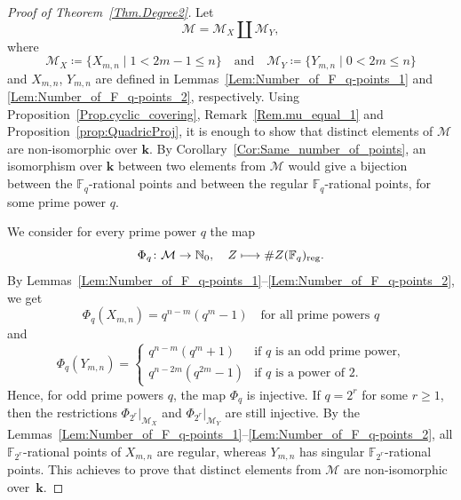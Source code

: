 \documentclass[JEP,XML,SOM,Unicode,NoFloatCountersInSection,published]{cedram}
\newcommand\mto{\mathchoice{\longmapsto}{\mapsto}{\mapsto}{\mapsto}}
\newcommand\quand{\quad\text{and}\quad}
\theoremstyle{definition}
\renewcommand\k{{\mathbf k}}
\newcommand\FF{{\mathbb F}}
\newcommand\NN{{\mathbb N}}
\newcommand{\kk}{\mathbf{k}}
\DeclareMathOperator{\reg}{reg}
\newcommand{\set}[2]{\{#1 \mid #2\}}
\begin{document}
\begin{proof}[Proof of Theorem~\ref{Thm.Degree2}]
Let
\[
\mathcal{M} = \mathcal{M}_X \coprod \mathcal{M}_Y,
\]
where
\[
\mathcal{M}_X \coloneqq \set{X_{m, n}}{1 < 2m-1 \leq n} \quand
\mathcal{M}_Y \coloneqq \set{Y_{m, n}}{0 < 2m \leq n}
\]
and $X_{m, n}$, $Y_{m, n}$ are defined in Lemmas~\ref{Lem:Number_of_F_q-points_1} and \ref{Lem:Number_of_F_q-points_2}, respectively. Using Proposition~\ref{Prop.cyclic_covering}, Remark~\ref{Rem.mu_equal_1} and Proposition~\ref{prop:QuadricProj},
it is enough to show that distinct elements of $\mathcal{M}$ are non-isomorphic over $\k$.
By Corollary~\ref{Cor:Same_number_of_points}, an isomorphism over $\kk$ between two elements from $\mathcal{M}$ would give a bijection between the $\FF_q$-rational points and between the regular $\FF_q$-rational points, for some prime power $q$.

We consider for every prime power $q$ the map
\[
\Phi_q \colon \mathcal{M} \to \NN_0, \quad
Z \mto \# Z(\FF_q)_{\reg}.
\]
By Lemmas~\ref{Lem:Number_of_F_q-points_1}--\ref{Lem:Number_of_F_q-points_2}, we get
\[
\Phi_q(X_{m, n}) = q^{n-m}(q^m-1) \quad \textrm{for all prime powers $q$}
\]
and
\[
\Phi_q(Y_{m, n}) =
\begin{cases}
q^{n-m}(q^m+1) & \textrm{if $q$ is an odd prime power,} \\
q^{n-2m}(q^{2m}-1) & \textrm{if $q$ is a power of $2$.}
\end{cases}
\]
Hence, for odd prime powers $q$, the map $\Phi_q$ is injective.
If $q = 2^r$ for some $r \geq 1$, then the restrictions $\Phi_{2^r} |_{\mathcal{M}_X}$ and
$\Phi_{2^r} |_{\mathcal{M}_Y}$ are still injective. By the Lemmas~\ref{Lem:Number_of_F_q-points_1}--\ref{Lem:Number_of_F_q-points_2}, all $\FF_{2^r}$-rational points of $X_{m, n}$
are regular, whereas $Y_{m, n}$ has singular $\FF_{2^r}$-rational points. This achieves to prove
that distinct elements from $\mathcal{M}$ are non-isomorphic over~$\k$.
\end{proof}
\end{document}
